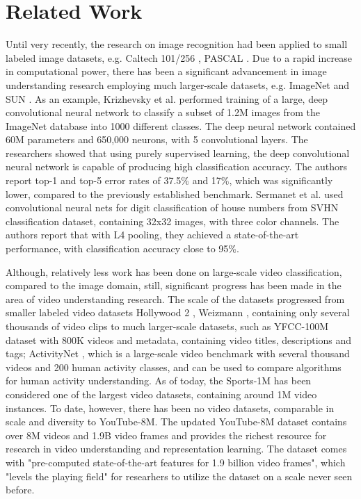 \documentclass{sig-alternate-05-2015}
\begin{document}
\section{Related Work}
Until very recently, the research on image recognition had been applied to small labeled image datasets, e.g. Caltech 101/256 \cite{1}, PASCAL \cite{2}. Due to a rapid increase in computational power, there has been a significant advancement in image understanding research employing much larger-scale datasets, e.g. ImageNet \cite{3} and SUN \cite{4}. As an example, Krizhevsky et al. \cite{5} performed training of a large, deep convolutional neural network to classify a subset of 1.2M images from the ImageNet database into 1000 different classes. The deep neural network contained 60M parameters and 650,000 neurons, with 5 convolutional layers. The researchers showed that using purely supervised learning, the deep convolutional neural network is capable of producing high classification accuracy. The authors report top-1 and top-5 error rates of 37.5\% and 17\%, which was significantly lower, compared to the previously established benchmark. Sermanet et al. \cite{6} used convolutional neural nets for digit classification of house numbers from SVHN classification dataset, containing 32x32 images, with three color channels. The authors report that with L4 pooling, they achieved a state-of-the-art performance, with classification accuracy close to 95\%. 

Although, relatively less work has been done on large-scale video classification, compared to the image domain, still, significant progress has been made in the area of video understanding research. The scale of the datasets progressed from smaller labeled video datasets Hollywood 2 \cite{7}, Weizmann \cite{8}, containing only several thousands of video clips to much larger-scale datasets, such as YFCC-100M dataset \cite{9} with 800K videos and metadata, containing video titles, descriptions and tags; ActivityNet \cite{10}, which is a large-scale video benchmark with several thousand videos and 200 human activity classes, and can be used to compare algorithms for human activity understanding. As of today, the Sports-1M \cite{11} has been considered one of the largest video datasets, containing around 1M video instances. To date, however, there has been no video datasets, comparable in scale and diversity to YouTube-8M. The updated YouTube-8M dataset contains over 8M videos and 1.9B video frames and provides the richest resource for research in video understanding and representation learning. The dataset comes with "pre-computed state-of-the-art features for 1.9 billion video frames", which "levels the playing field" for researhers to utilize the dataset on a scale never seen before. 
\end{document}
